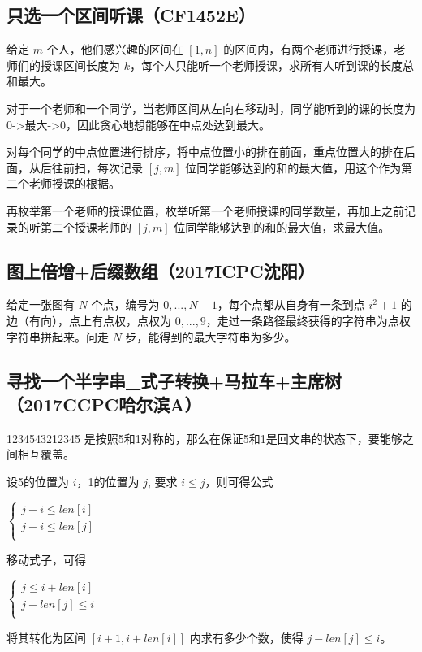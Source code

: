 \documentclass[twoside,a4paper]{article}
\begin{document}
\subsection{只选一个区间听课（CF1452E）}
给定 $m$ 个人，他们感兴趣的区间在 $[1,n]$ 的区间内，有两个老师进行授课，老师们的授课区间长度为 $k$，每个人只能听一个老师授课，求所有人听到课的长度总和最大。\par
对于一个老师和一个同学，当老师区间从左向右移动时，同学能听到的课的长度为0->最大->0，因此贪心地想能够在中点处达到最大。\par
对每个同学的中点位置进行排序，将中点位置小的排在前面，重点位置大的排在后面，从后往前扫，每次记录 $[j,m]$ 位同学能够达到的和的最大值，用这个作为第二个老师授课的根据。\par
再枚举第一个老师的授课位置，枚举听第一个老师授课的同学数量，再加上之前记录的听第二个授课老师的 $[j,m]$ 位同学能够达到的和的最大值，求最大值。\par


\subsection{图上倍增+后缀数组（2017ICPC沈阳）}
给定一张图有 $N$ 个点，编号为 $0,...,N-1$，每个点都从自身有一条到点 $i^{2}+1$ 的边（有向），点上有点权，点权为 $0,...,9$，走过一条路径最终获得的字符串为点权字符串拼起来。问走 $N$ 步，能得到的最大字符串为多少。


\subsection{寻找一个半字串\_式子转换+马拉车+主席树（2017CCPC哈尔滨A）}
1234543212345 是按照5和1对称的，那么在保证5和1是回文串的状态下，要能够之间相互覆盖。\par
设5的位置为 $i$，1的位置为 $j$, 要求 $i \leq j$，则可得公式\par
$
\left\{\begin{matrix}
j-i \leq len[i] \\
j-i \leq len[j] \\
\end{matrix}\right.
$\par
移动式子，可得\par
$
\left\{\begin{matrix}
j \leq i+len[i] \\
j-len[j] \leq i \\
\end{matrix}\right.
$\par
将其转化为区间 $[i+1, i+len[i]]$ 内求有多少个数，使得 $j-len[j] \leq i$。

\end{document}
